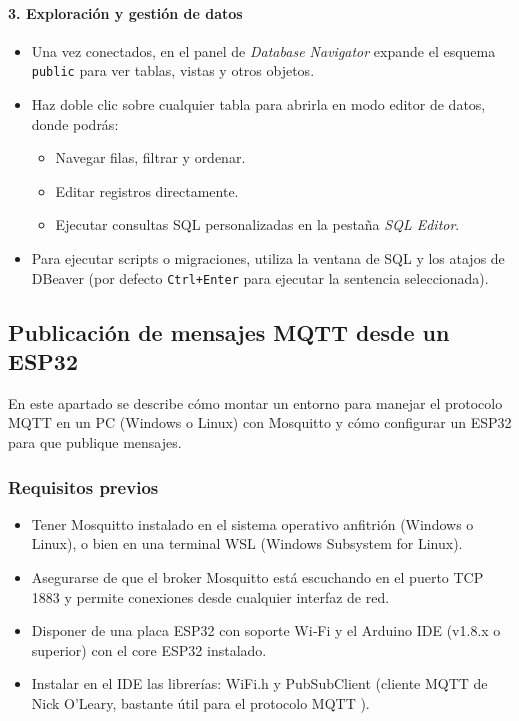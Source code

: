 \documentclass[12pt, a4paper]{article}
\begin{document}
\begin{umaappendices}
	\paragraph{3. Exploración y gestión de datos}  
	\begin{itemize}
		\item Una vez conectados, en el panel de \emph{Database Navigator} expande el esquema \texttt{public} para ver tablas, vistas y otros objetos.
		\item Haz doble clic sobre cualquier tabla para abrirla en modo editor de datos, donde podrás:
		\begin{itemize}
			\item Navegar filas, filtrar y ordenar.
			\item Editar registros directamente.
			\item Ejecutar consultas SQL personalizadas en la pestaña \emph{SQL Editor}.
		\end{itemize}
		\item Para ejecutar scripts o migraciones, utiliza la ventana de SQL y los atajos de DBeaver (por defecto \texttt{Ctrl+Enter} para ejecutar la sentencia seleccionada).
	\end{itemize}

	\subsection{Publicación de mensajes MQTT desde un ESP32}
	
	En este apartado se describe cómo montar un entorno para manejar el protocolo MQTT en un PC (Windows o Linux) con Mosquitto y cómo configurar un ESP32 para que publique mensajes.
	
	\subsubsection{Requisitos previos}
	\begin{itemize}
		\item Tener Mosquitto \cite{Mosquitto} instalado en el sistema operativo anfitrión (Windows o Linux), o bien en una terminal WSL (Windows Subsystem for Linux).
		\item Asegurarse de que el broker Mosquitto está escuchando en el puerto TCP 1883 y permite conexiones desde cualquier interfaz de red.
		\item Disponer de una placa ESP32 con soporte Wi‑Fi y el Arduino IDE (v1.8.x o superior) con el core ESP32 instalado.
		\item Instalar en el IDE las librerías: WiFi.h y PubSubClient (cliente MQTT de Nick O'Leary, bastante útil para el protocolo MQTT \cite{PubSubClient}).


\end{itemize}
\end{umaappendices}
\end{document}

